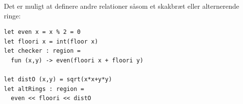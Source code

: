 \documentclass[rgb]{beamer}
\begin{document}
\begin{frame}[fragile]
\begin{footnotesize}


  \vspace{2ex}

  Det er muligt at definere andre relationer såsom et skakbræt eller
  alternerende ringe:

\begin{lstlisting}[numbers=none,frame=none,mathescape]
let even x = x % 2 = 0
let floori x = int(floor x)
let checker : region =
  fun (x,y) -> even(floori x + floori y)

let distO (x,y) = sqrt(x*x+y*y)
let altRings : region =
  even << floori << distO
\end{lstlisting}

\mbox{ }\hfill
{}\hfill
{}
\hfill \mbox{ }

\end{footnotesize}
\end{frame}
\end{document}
